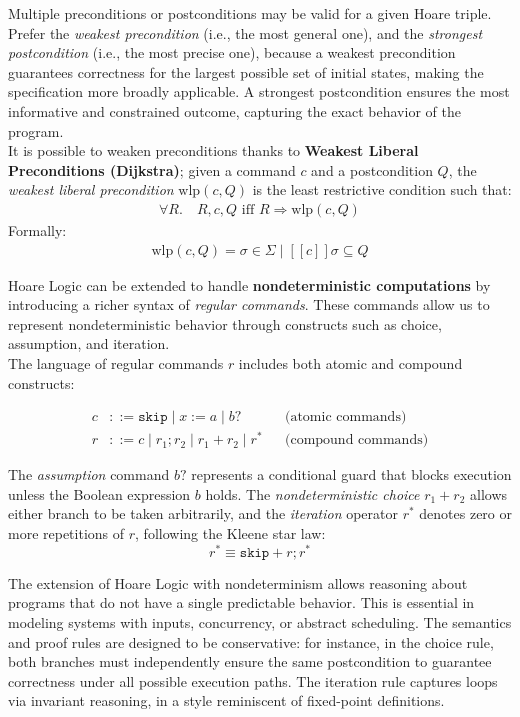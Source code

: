 \documentclass[parskip=half]{scrartcl}
\begin{document}
Multiple preconditions or postconditions may be valid for a given Hoare triple. Prefer the \emph{weakest precondition} (i.e., the most general one), and the \emph{strongest postcondition} (i.e., the most precise one), because a weakest precondition guarantees correctness for the largest possible set of initial states, making the specification more broadly applicable. A strongest postcondition ensures the most informative and constrained outcome, capturing the exact behavior of the program.
\\It is possible to weaken preconditions thanks to \textbf{Weakest Liberal Preconditions (Dijkstra)}; given a command $c$ and a postcondition $Q$, the \emph{weakest liberal precondition} $\text{wlp}(c, Q)$ is the least restrictive condition such that:
\begin{align*}
\forall R. \quad {R}, c, {Q} \text{ iff } R \Rightarrow \text{wlp}(c, Q)
\end{align*}
Formally:
\begin{align*}
\text{wlp}(c, Q) = {\sigma \in \Sigma \mid [[c]]{\sigma} \subseteq Q}
\end{align*}

Hoare Logic can be extended to handle \textbf{nondeterministic computations} by introducing a richer syntax of \emph{regular commands}. These commands allow us to represent nondeterministic behavior through constructs such as choice, assumption, and iteration.
\\ The language of regular commands $r$ includes both atomic and compound constructs:

\begin{align*}
  c &::= \texttt{skip} \mid x := a \mid b? && \text{(atomic commands)} \\
  r &::= c \mid r_1 ; r_2 \mid r_1 + r_2 \mid r^* && \text{(compound commands)}
\end{align*}

\noindent
The \emph{assumption} command $b?$ represents a conditional guard that blocks execution unless the Boolean expression $b$ holds. The \emph{nondeterministic choice} $r_1 + r_2$ allows either branch to be taken arbitrarily, and the \emph{iteration} operator $r^*$ denotes zero or more repetitions of $r$, following the Kleene star law:
\[
r^* \equiv \texttt{skip} + r ; r^*
\]

The extension of Hoare Logic with nondeterminism allows reasoning about programs that do not have a single predictable behavior. This is essential in modeling systems with inputs, concurrency, or abstract scheduling. The semantics and proof rules are designed to be conservative: for instance, in the choice rule, both branches must independently ensure the same postcondition to guarantee correctness under all possible execution paths. The iteration rule captures loops via invariant reasoning, in a style reminiscent of fixed-point definitions.
\end{document}
